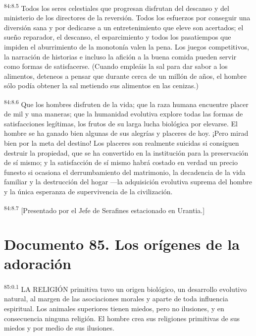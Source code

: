 \documentclass[twoside, 11pt]{book}
\begin{document}
\par
\textsuperscript{84:8.5} Todos los seres celestiales que progresan disfrutan del descanso y del ministerio de los directores de la reversión. Todos los esfuerzos por conseguir una diversión sana y por dedicarse a un entretenimiento que eleve son acertados; el sueño reparador, el descanso, el esparcimiento y todos los pasatiempos que impiden el aburrimiento de la monotonía valen la pena. Los juegos competitivos, la narración de historias e incluso la afición a la buena comida pueden servir como formas de satisfacerse. (Cuando empleáis la sal para dar sabor a los alimentos, deteneos a pensar que durante cerca de un millón de años, el hombre sólo podía obtener la sal metiendo sus alimentos en las cenizas.)

\par
\textsuperscript{84:8.6} Que los hombres disfruten de la vida; que la raza humana encuentre placer de mil y una maneras; que la humanidad evolutiva explore todas las formas de satisfacciones legítimas, los frutos de su larga lucha biológica por elevarse. El hombre se ha ganado bien algunas de sus alegrías y placeres de hoy. ¡Pero mirad bien por la meta del destino! Los placeres son realmente suicidas si consiguen destruir la propiedad, que se ha convertido en la institución para la preservación de sí mismo; y la satisfacción de sí mismo habrá costado en verdad un precio funesto si ocasiona el derrumbamiento del matrimonio, la decadencia de la vida familiar y la destrucción del hogar ---la adquisición evolutiva suprema del hombre y la única esperanza de supervivencia de la civilización.

\par
\textsuperscript{84:8.7} [Presentado por el Jefe de Serafines estacionado en Urantia.]


\chapter{Documento 85. Los orígenes de la adoración}
\par
\textsuperscript{85:0.1} LA RELIGIÓN primitiva tuvo un origen biológico, un desarrollo evolutivo natural, al margen de las asociaciones morales y aparte de toda influencia espiritual. Los animales superiores tienen miedos, pero no ilusiones, y en consecuencia ninguna religión. El hombre crea sus religiones primitivas de sus miedos y por medio de sus ilusiones.
\end{document}
